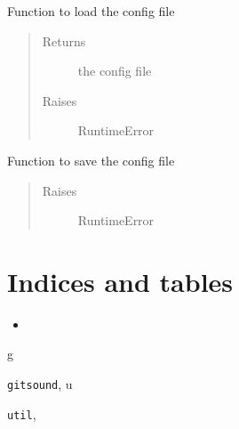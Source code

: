 \documentclass[letterpaper,10pt,english]{sphinxmanual}
\begin{document}

\begin{fulllineitems}
\label{index:util.load_config}
Function to load the config file
\begin{quote}\begin{description}
\item[{Returns}] \leavevmode
the config file

\item[{Raises}] \leavevmode
RuntimeError

\end{description}\end{quote}

\end{fulllineitems}


\begin{fulllineitems}
\label{index:util.save_config}
Function to save the config file
\begin{quote}\begin{description}
\item[{Raises}] \leavevmode
RuntimeError

\end{description}\end{quote}

\end{fulllineitems}



\chapter{Indices and tables}
\label{index:indices-and-tables}\label{index:gitsound-documentation}\begin{itemize}
\item {} 

\end{itemize}


\renewcommand{\indexname}{Python Module Index}
\begin{theindex}
\def\bigletter#1{{\Large\sffamily#1}\nopagebreak\vspace{1mm}}
\bigletter{g}
\item {\texttt{gitsound}}, \pageref{index:module-gitsound}
\indexspace
\bigletter{u}
\item {\texttt{util}}, \pageref{index:module-util}
\end{theindex}

\renewcommand{\indexname}{Index}
\printindex
\end{document}
